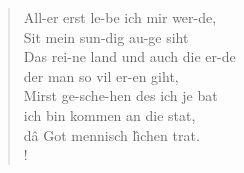 \documentclass[11pt]{article}
\begin{document}
\newlength{\vcolwidth}
\setlength{\vcolwidth}{0.48\textwidth}

\newlength{\ssep}
\setlength{\ssep}{3ex}


\newenvironment{stanza}{
\stepcounter{Verse}
\flagverse{\theVerse. }
}{
}


\newcommand{\numberverse}{}

\begin{verse}

\begin{multicols}{2}

%
%
\begin{stanza} 
All-er erst le-be ich mir wer-de, \\
Sit mein sun-dig au-ge siht \\
Das rei-ne land und auch die er-de \\
der man so vil er-en giht, \\
Mirst ge-sche-hen des ich je bat\\
ich bin kommen an die stat,\\
d\^a Got mennisch l\^\i chen trat.\\!
\end{stanza}



\end{multicols}
\end{verse}
\end{document}
